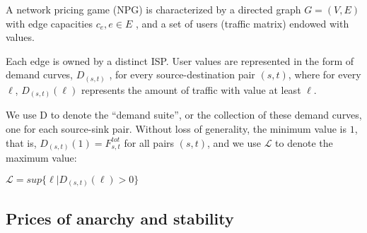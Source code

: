\documentclass{beamer}
\begin{document}
\begin{frame}
A network pricing game (NPG) is characterized by a directed graph $G = (V, E)$
with edge capacities ${c_e}, e \in E$ , and a set of users (traffic matrix) endowed with
values.

Each edge is owned by a distinct ISP.
User values are represented in the form of demand curves, $D_{(s,t)}$ ,
for every source-destination pair $(s, t)$, where for every $\ell$, $D_{(s,t)} (\ell)$ represents the
amount of traffic with value at least $\ell$.

We use D to denote the “demand suite”, or the collection of these demand curves, one for each source-sink pair.
Without loss of generality, the minimum value is $1$, that is, $D_{(s,t)} (1) = F^{tot}_{s,t}$ for all pairs $(s, t)$,
and we use $\mathcal{L}$ to denote the maximum value:
\begin{center}
$\mathcal{L} = sup\{\ell|D_{(s,t)} (\ell) > 0\}$
\end{center}
\end{frame}



\subsection{Prices of anarchy and stability}
\end{document}
